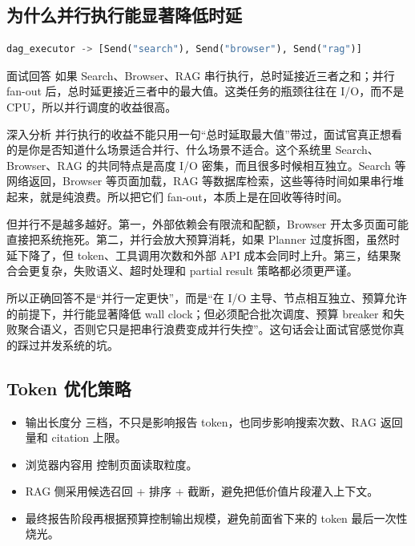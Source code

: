 \documentclass[12pt]{article}
\begin{document}
\subsection{为什么并行执行能显著降低时延}
\begin{lstlisting}[language=Python,caption={LangGraph Send API 的作用}]
dag_executor -> [Send("search"), Send("browser"), Send("rag")]
\end{lstlisting}

\begin{qaBox}{面试回答}
如果 Search、Browser、RAG 串行执行，总时延接近三者之和；并行 fan-out 后，总时延更接近三者中的最大值。这类任务的瓶颈往往在 I/O，而不是 CPU，所以并行调度的收益很高。
\end{qaBox}

\begin{analysisBox}{深入分析}
并行执行的收益不能只用一句“总时延取最大值”带过，面试官真正想看的是你是否知道什么场景适合并行、什么场景不适合。这个系统里 Search、Browser、RAG 的共同特点是高度 I/O 密集，而且很多时候相互独立。Search 等网络返回，Browser 等页面加载，RAG 等数据库检索，这些等待时间如果串行堆起来，就是纯浪费。所以把它们 fan-out，本质上是在回收等待时间。

但并行不是越多越好。第一，外部依赖会有限流和配额，Browser 开太多页面可能直接把系统拖死。第二，并行会放大预算消耗，如果 Planner 过度拆图，虽然时延下降了，但 token、工具调用次数和外部 API 成本会同时上升。第三，结果聚合会更复杂，失败语义、超时处理和 partial result 策略都必须更严谨。

所以正确回答不是“并行一定更快”，而是“在 I/O 主导、节点相互独立、预算允许的前提下，并行能显著降低 wall clock；但必须配合批次调度、预算 breaker 和失败聚合语义，否则它只是把串行浪费变成并行失控”。这句话会让面试官感觉你真的踩过并发系统的坑。
\end{analysisBox}

\subsection{Token 优化策略}
\begin{itemize}[leftmargin=2em]
  \item 输出长度分  三档，不只是影响报告 token，也同步影响搜索次数、RAG 返回量和 citation 上限。
  \item 浏览器内容用  控制页面读取粒度。
  \item RAG 侧采用候选召回 + 排序 + 截断，避免把低价值片段灌入上下文。
  \item 最终报告阶段再根据预算控制输出规模，避免前面省下来的 token 最后一次性烧光。
\end{itemize}
\end{document}

